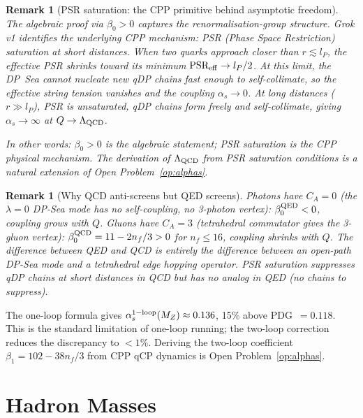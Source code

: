 \documentclass[11pt,letterpaper]{article}
\newtheorem{remark}[theorem]{Remark}
\newcommand{\lP}{l_P}
\newcommand{\as}{\alpha_s}
\begin{document}
\begin{remark}[PSR saturation: the CPP primitive behind asymptotic freedom]
\label{rem:psr}
The algebraic proof via $\beta_0 > 0$ captures the
renormalisation-group structure.  Grok v1 identifies the underlying
CPP mechanism: \emph{PSR (Phase Space Restriction) saturation at
short distances}.  When two quarks approach closer than
$r \lesssim \lP$, the effective PSR shrinks toward its minimum
$\text{PSR}_{\rm eff} \to \lP/2$.  At this limit, the DP~Sea cannot
nucleate new qDP chains fast enough to self-collimate, so the
effective string tension vanishes and the coupling $\as \to 0$.
At long distances ($r \gg \lP$), PSR is unsaturated, qDP chains
form freely and self-collimate, giving $\as \to \infty$ at
$Q \to \Lambda_{\rm QCD}$.

In other words: $\beta_0 > 0$ is the algebraic statement;
PSR saturation is the CPP physical mechanism.  The derivation
of $\Lambda_{\rm QCD}$ from PSR saturation conditions is a
natural extension of Open Problem~\ref{op:alphas}.
\end{remark}

\begin{remark}[Why QCD anti-screens but QED screens]
Photons have $C_A = 0$ (the $\lambda=0$ DP-Sea mode has no
self-coupling, no 3-photon vertex): $\beta_0^{\rm QED} < 0$,
coupling grows with $Q$.  Gluons have $C_A = 3$ (tetrahedral
commutator gives the 3-gluon vertex): $\beta_0^{\rm QCD} = 11 -
2n_f/3 > 0$ for $n_f \leq 16$, coupling shrinks with $Q$.  The
difference between QED and QCD is entirely the difference between
an open-path DP-Sea mode and a tetrahedral edge hopping operator.
PSR saturation suppresses qDP chains at short distances in QCD
but has no analog in QED (no chains to suppress).
\end{remark}

The one-loop formula gives $\as^{\rm 1-loop}(M_Z) \approx 0.136$,
15\% above PDG~$= 0.118$.  This is the standard limitation of
one-loop running; the two-loop correction reduces the discrepancy
to $<1\%$.  Deriving the two-loop coefficient $\beta_1 = 102 -
38n_f/3$ from CPP qCP dynamics is Open Problem~\ref{op:alphas}.

\section{Hadron Masses}
\label{sec:hadrons}
\end{document}
